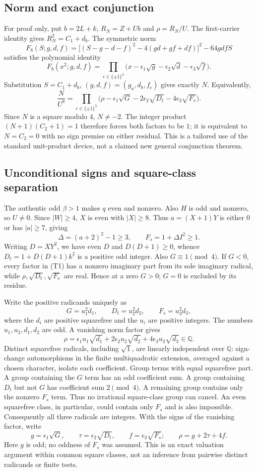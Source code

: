 \subsection{Norm and exact conjunction}
For proof only, put $b=2L+k$, $R_N=Z+Ub$ and $\rho=R_N/U$.
The first-carrier identity gives $R_N^2=C_1+d_b$. The symmetric norm
\[
 F_8(S;g,d,f)=\bigl[(S-g-d-f)^2-4(gd+gf+df)\bigr]^2-64gdfS
\]
satisfies the polynomial identity
\[
 F_8(x^2;g,d,f)=\prod_{\epsilon\in\{\pm1\}^3}
   \bigl(x-\epsilon_1\sqrt g-\epsilon_2\sqrt d-\epsilon_3\sqrt f\bigr).
\]
Substitution $S=C_1+d_b$, $(g,d,f)=(g_a,d_b,f_c)$ gives exactly $N$.
Equivalently,
\[
 \frac{N}{U^8}=\prod_{\epsilon\in\{\pm1\}^3}
 \bigl(\rho-\epsilon_1\sqrt G-2\epsilon_2\sqrt{D_t}
                         -4\epsilon_3\sqrt{F_s}\bigr). \tag{T1}
\]
Since $N$ is a square modulo $4$, $N\ne-2$. The integer product
$(N+1)(C_2+1)=1$ therefore forces both factors to be $1$; it is equivalent to
$N=C_2=0$ with no sign premise on either residual. This is a tailored use of the
standard unit-product device, not a claimed new general conjunction theorem.

\subsection{Unconditional signs and square-class separation}
The authentic odd $\beta>1$ makes $q$ even and nonzero. Also $H$ is odd and
nonzero, so $U\ne0$. Since $|W|\ge4$, $X$ is even with $|X|\ge8$.
Thus $a=(X+1)Y$ is either $0$ or has $|a|\ge7$, giving
\[
 \Delta=(a+2)^2-1\ge3,\qquad F_s=1+\Delta I^2\ge1.
\]
Writing $D=XY^2$, we have even $D$ and $D(D+1)\ge0$, whence
$D_t=1+D(D+1)k^2$ is a positive odd integer. Also $G\equiv1\pmod4$.
If $G<0$, every factor in (T1) has a nonzero imaginary part from its sole
imaginary radical, while $\rho,\sqrt{D_t},\sqrt{F_s}$ are real. Hence at a zero
$G>0$; $G=0$ is excluded by its residue.

Write the positive radicands uniquely as
\[
 G=u_1^2d_1,\qquad D_t=u_2^2d_2,\qquad F_s=u_3^2d_3,
\]
where the $d_i$ are positive squarefree and the $u_i$ are positive integers.
The numbers $u_1,u_2,d_1,d_2$ are odd. A vanishing norm factor gives
\[
 \rho=\epsilon_1u_1\sqrt{d_1}
       +2\epsilon_2u_2\sqrt{d_2}+4\epsilon_3u_3\sqrt{d_3}\in\mathbb Q.
\]
Distinct squarefree radicals, including $\sqrt1$, are linearly independent over
$\mathbb Q$: sign-change automorphisms in the finite multiquadratic extension,
averaged against a chosen character, isolate each coefficient.
Group terms with equal squarefree part. A group containing the $G$ term has an
odd coefficient sum. A group containing $D_t$ but not $G$ has coefficient sum
$2\pmod4$. A remaining group contains only the nonzero $F_s$ term. Thus no
irrational square-class group can cancel. An even squarefree class, in
particular, could contain only $F_s$ and is also impossible.
Consequently all three radicals are integers. With the signs of the vanishing
factor, write
\[
 g=\epsilon_1\sqrt G,\qquad \tau=\epsilon_2\sqrt{D_t},\qquad
 f=\epsilon_3\sqrt{F_s};\qquad \rho=g+2\tau+4f.
\]
Here $g$ is odd; no oddness of $F_s$ was assumed. This is an exact valuation
argument within common square classes, not an inference from pairwise distinct
radicands or finite tests.

